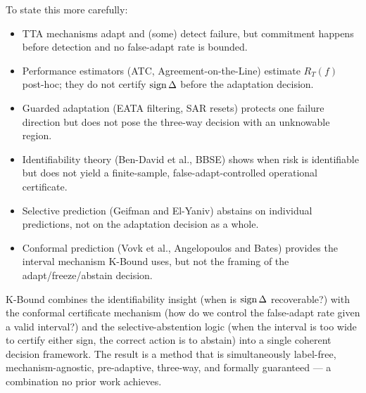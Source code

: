 To state this more carefully:
\begin{itemize}
\item TTA mechanisms adapt and (some) detect failure, but commitment happens
    before detection and no false-adapt rate is bounded.
\item Performance estimators (ATC, Agreement-on-the-Line) estimate $R_T(f)$
    post-hoc; they do not certify $\operatorname{sign}\Delta$ before the adaptation decision.
\item Guarded adaptation (EATA filtering, SAR resets) protects one failure
    direction but does not pose the three-way decision with an unknowable
    region.
\item Identifiability theory (Ben-David et al., BBSE) shows when risk is
    identifiable but does not yield a finite-sample, false-adapt-controlled
    operational certificate.
\item Selective prediction (Geifman and El-Yaniv) abstains on individual
    predictions, not on the adaptation decision as a whole.
\item Conformal prediction (Vovk et al., Angelopoulos and Bates) provides the
    interval mechanism K-Bound uses, but not the framing of the
    adapt/freeze/abstain decision.
\end{itemize}

K-Bound combines the identifiability insight (when is $\operatorname{sign}\Delta$
recoverable?) with the conformal certificate mechanism (how do we control
the false-adapt rate given a valid interval?) and the selective-abstention
logic (when the interval is too wide to certify either sign, the correct
action is to abstain) into a single coherent decision framework.
The result is a method that is simultaneously label-free, mechanism-agnostic,
pre-adaptive, three-way, and formally guaranteed --- a combination no prior
work achieves.
